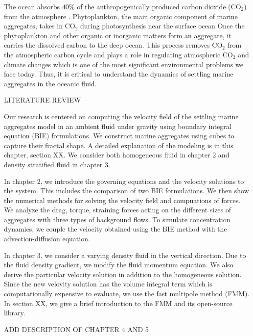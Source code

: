 The ocean absorbs $40 \%$ of the anthropogenically produced carbon dioxide (CO$_2$) from the atmosphere \cite{omand_sinking_2020}. 
 Phytoplankton, the main organic component of marine aggregates, takes in CO$_2$ during photosynthesis near the surface ocean
Once the phytoplankton and other organic or inorganic matters form an aggregate, it carries the dissolved carbon to the deep ocean. This process removes CO$_2$ from the atmospheric carbon cycle \cite{burd_particle_2009} and plays a role in regulating atmospheric CO$_2$ and climate changes which is one of the most significant environmental problems we face today. 
 Thus, it is critical to understand the dynamics of settling marine aggregates in the oceanic fluid.
 \par
{\color{blue} LITERATURE REVIEW}
 \par
Our research is centered on computing the velocity field of the settling marine aggregates model in an ambient fluid under gravity using boundary integral equation (BIE) formulations. We construct marine aggregates using cubes to capture their fractal shape. A detailed explanation of the modeling is in this chapter, section XX. We consider both homogeneous fluid in chapter 2 and density stratified fluid in chapter 3. 
\par
In chapter 2, we introduce the governing equations and the velocity solutions to the system. This includes the comparison of two BIE formulations. We then show the numerical methods for solving the velocity field and compuations of forces. We analyze the drag, torque, straining forces acting on the different sizes of aggregates with three types of background flows.
 To simulate concentration dynamics, we couple the velocity obtained using the BIE method with the advection-diffusion equation.
\par
In chapter 3, we consider a varying density fluid in the vertical direction. Due to the fluid density gradient, we modify the fluid momentum equation. We also derive the particular velocity solution in addition to the homogeneous solution. Since the new velovity solution has the volume integral term which is computationally expensive to evaluate, we use the fast multipole method (FMM). In section XX, we give a brief introduction to the FMM and its open-source library. 
\par
{\color{blue} ADD DESCRIPTION OF CHAPTER 4 AND 5}
%
%
%

